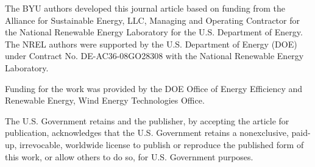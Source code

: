 \documentclass[wes, manuscript]{copernicus}
\begin{document}



\begin{acknowledgements}
The BYU authors developed this journal article based on funding from the Alliance for Sustainable Energy, LLC, Managing and Operating Contractor for the National Renewable Energy Laboratory for the U.S. Department of Energy.  The NREL authors were supported by the U.S. Department of Energy (DOE) under Contract No. DE-AC36-08GO28308 with the National Renewable Energy Laboratory.

Funding for the work was provided by the DOE Office of Energy Efficiency and Renewable Energy, Wind Energy Technologies Office.

The U.S. Government retains and the publisher, by accepting the article for publication, acknowledges that the U.S. Government retains a nonexclusive, paid-up, irrevocable, worldwide license to publish or reproduce the published form of this work, or allow others to do so, for U.S. Government purposes.
\end{acknowledgements}











\end{document}
